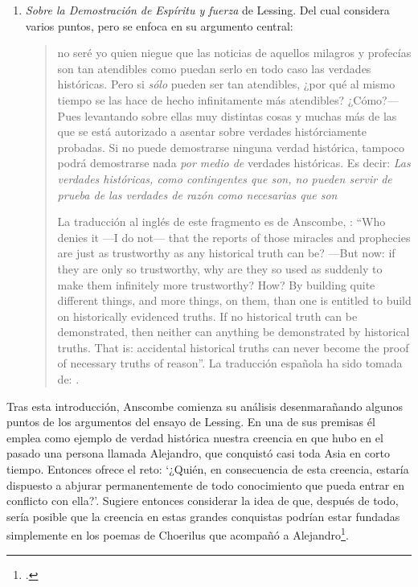 \begin{enumerate}
\item \emph{Sobre la Demostración de Espíritu y fuerza} de Lessing. Del cual considera varios puntos, pero se enfoca en su argumento central: \blockquote[La traducción al inglés de este fragmento es de Anscombe, {\cite[Cf.][22]{anscombe2008faith:prophandmi}}: \enquote{Who denies it ---I do not--- that the reports of those miracles and prophecies are just as trustworthy as any historical truth can be? ---But now: if they are only so trustworthy, why are they so used as suddenly to make them infinitely more trustworthy? How? By building quite different things, and more things, on them, than one is entitled to build on historically evidenced truths. If no historical truth can be demonstrated, then neither can anything be demonstrated by historical truths. That is: accidental historical truths can never become the proof of necessary truths of reason}. La traducción española ha sido tomada de: {\cite[447]{lessing1982escritos:demo}}.]{no seré yo quien niegue que las noticias de aquellos milagros y profecías son tan atendibles como puedan serlo en todo caso las verdades históricas. Pero si \emph{sólo} pueden ser tan atendibles, ¿por qué al mismo tiempo se las hace de hecho infinitamente más atendibles? ¿Cómo?---Pues levantando sobre ellas muy distintas cosas y muchas más de las que se está autorizado a asentar sobre verdades histórciamente probadas. Si no puede demostrarse ninguna verdad histórica, tampoco podrá demostrarse nada \emph{por medio de} verdades históricas. Es decir: \emph{Las verdades históricas, como contingentes que son, no pueden servir de prueba de las verdades de razón como necesarias que son}}.

\end{enumerate}

Tras esta introducción, Anscombe comienza su análisis desenmarañando algunos puntos de los argumentos del ensayo de Lessing. En una de sus premisas él emplea como ejemplo de verdad histórica nuestra creencia en que hubo en el pasado una persona llamada Alejandro, que conquistó casi toda Asia en corto tiempo. Entonces ofrece el reto: \enquote*{¿Quién, en consecuencia de esta creencia, estaría dispuesto a abjurar permanentemente de todo conocimiento que pueda entrar en conflicto con ella?}. Sugiere entonces considerar la idea de que, después de todo, sería posible que la creencia en estas grandes conquistas podrían estar fundadas simplemente en los poemas de Choerilus que acompañó a Alejandro\footnote{\cite[Cf.][448]{lessing1982escritos:demo}.}.

